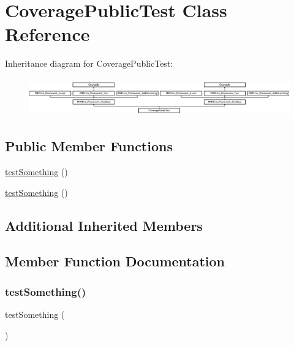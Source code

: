 \hypertarget{class_coverage_public_test}{}\section{Coverage\+Public\+Test Class Reference}
\label{class_coverage_public_test}
Inheritance diagram for Coverage\+Public\+Test\+:\begin{figure}[H]
\begin{center}
\leavevmode
\includegraphics[height=1.651917cm]{class_coverage_public_test}
\end{center}
\end{figure}
\subsection*{Public Member Functions}
\begin{DoxyCompactItemize}
\item 
\mbox{\hyperlink{class_coverage_public_test_a0fc4e17369bc9607ebdd850d9eda8167}{test\+Something}} ()
\item 
\mbox{\hyperlink{class_coverage_public_test_a0fc4e17369bc9607ebdd850d9eda8167}{test\+Something}} ()
\end{DoxyCompactItemize}
\subsection*{Additional Inherited Members}


\subsection{Member Function Documentation}
\mbox{\label{class_coverage_public_test_a0fc4e17369bc9607ebdd850d9eda8167}} 
\subsubsection{\texorpdfstring{test\+Something()}{testSomething()}\hspace{0.1cm}{\footnotesize\ttfamily [1/2]}}
{\footnotesize\ttfamily test\+Something (\begin{DoxyParamCaption}{ }\end{DoxyParamCaption})}

